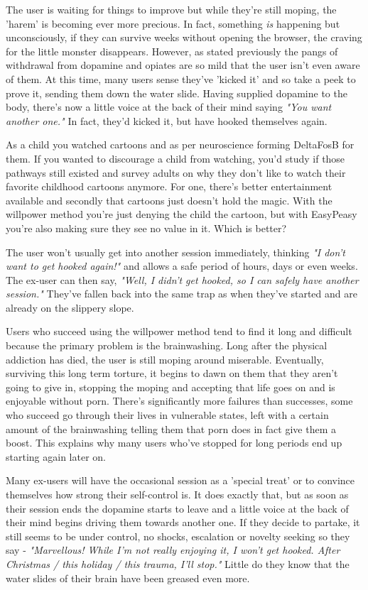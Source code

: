 \documentclass[easypeasy.tex]{subfiles}
\begin{document}
The user is waiting for things to improve but while they're still moping, the 'harem' is becoming ever more precious. In fact, something \textit{is} happening but unconsciously, if they can survive weeks without opening the browser, the craving for the little monster disappears. However, as stated previously the pangs of withdrawal from dopamine and opiates are so mild that the user isn't even aware of them. At this time, many users sense they've 'kicked it' and so take a peek to prove it, sending them down the water slide. Having supplied dopamine to the body, there's now a little voice at the back of their mind saying \textit{"You want another one."} In fact, they'd kicked it, but have hooked themselves again.

As a child you watched cartoons and as per neuroscience forming DeltaFosB for them. If you wanted to discourage a child from watching, you'd study if those pathways still existed and survey adults on why they don't like to watch their favorite childhood cartoons anymore. For one, there's better entertainment available and secondly that cartoons just doesn't hold the magic. With the willpower method you're just denying the child the cartoon, but with EasyPeasy you're also making sure they see no value in it. Which is better?

The user won't usually get into another session immediately, thinking \textit{"I don't want to get hooked again!"} and allows a safe period of hours, days or even weeks. The ex-user can then say, \textit{"Well, I didn't get hooked, so I can safely have another session."} They've fallen back into the same trap as when they've started and are already on the slippery slope.

Users who succeed using the willpower method tend to find it long and difficult because the primary problem is the brainwashing. Long after the physical addiction has died, the user is still moping around miserable. Eventually, surviving this long term torture, it begins to dawn on them that they aren't going to give in, stopping the moping and accepting that life goes on and is enjoyable without porn. There's significantly more failures than successes, some who succeed go through their lives in vulnerable states, left with a certain amount of the brainwashing telling them that porn does in fact give them a boost. This explains why many users who've stopped for long periods end up starting again later on.

Many ex-users will have the occasional session as a 'special treat' or to convince themselves how strong their self-control is. It does exactly that, but as soon as their session ends the dopamine starts to leave and a little voice at the back of their mind begins driving them towards another one. If they decide to partake, it still seems to be under control, no shocks, escalation or novelty seeking so they say - \textit{"Marvellous! While I'm not really enjoying it, I won't get hooked. After Christmas / this holiday / this trauma, I'll stop."} Little do they know that the water slides of their brain have been greased even more.
\end{document}
